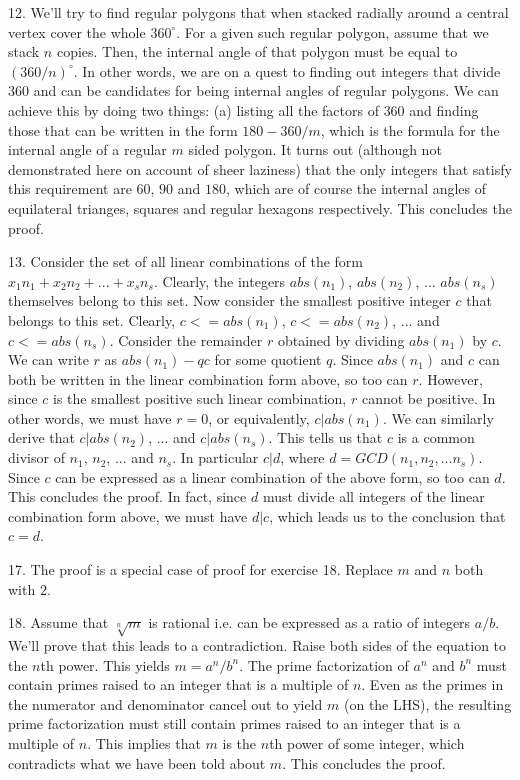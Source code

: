 \documentclass{article}
\begin{document}
12. We'll try to find regular polygons that when stacked radially around a central vertex cover the whole $360^\circ$. For a given such regular polygon, assume that we stack $n$ copies. Then, the internal angle of that polygon must be equal to $(360 / n)^\circ$. In other words, we are on a quest to finding out integers that divide $360$ and can be candidates for being internal angles of regular polygons. We can achieve this by doing two things: (a) listing all the factors of $360$ and finding those that can be written in the form $180 - 360 / m$, which is the formula for the internal angle of a regular $m$ sided polygon. It turns out (although not demonstrated here on account of sheer laziness) that the only integers that satisfy this requirement are $60$, $90$ and $180$, which are of course the internal angles of equilateral trianges, squares and regular hexagons respectively. This concludes the proof.

13. Consider the set of all linear combinations of the form $x_1n_1 + x_2n_2 + ... + x_sn_s$. Clearly, the integers $abs(n_1)$, $abs(n_2)$, ... $abs(n_s)$ themselves belong to this set. Now consider the smallest positive integer $c$ that belongs to this set. Clearly, $c <= abs(n_1)$, $c <= abs(n_2)$, ... and $c <= abs(n_s)$. Consider the remainder $r$ obtained by dividing $abs(n_1)$ by $c$. We can write $r$ as $abs(n_1) - qc$ for some quotient $q$. Since $abs(n_1)$ and $c$ can both be written in the linear combination form above, so too can $r$. However, since $c$ is the smallest positive such linear combination, $r$ cannot be positive. In other words, we must have $r = 0$, or equivalently, $c | abs(n_1)$. We can similarly derive that $c | abs(n_2)$, ... and $c | abs(n_s)$. This tells us that $c$ is a common divisor of $n_1$, $n_2$, ... and $n_s$. In particular $c | d$, where $d = GCD(n_1, n_2, ...n_s)$. Since $c$ can be expressed as a linear combination of the above form, so too can $d$. This concludes the proof. In fact, since $d$ must divide all integers of the linear combination form above, we must have $d | c$, which leads us to the conclusion that $c = d$.

17. The proof is a special case of proof for exercise 18. Replace $m$ and $n$ both with $2$.

18. Assume that $\sqrt[n]{m}$ is rational i.e. can be expressed as a ratio of integers $a / b$. We'll prove that this leads to a contradiction. Raise both sides of the equation to the $n$th power. This yields $m = a^n / b^n$. The prime factorization of $a^n$ and $b^n$ must contain primes raised to an integer that is a multiple of $n$. Even as the primes in the numerator and denominator cancel out to yield $m$ (on the LHS), the resulting prime factorization must still contain primes raised to an integer that is a multiple of $n$. This implies that $m$ is the $n$th power of some integer, which contradicts what we have been told about $m$. This concludes the proof.
\end{document}
